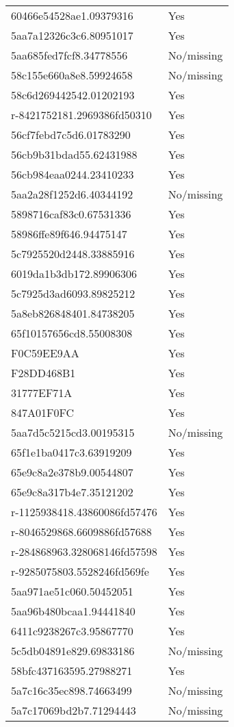 \begin{tabular}{ll}
60466e54528ae1.09379316 & Yes \\
5aa7a12326c3c6.80951017 & Yes \\
5aa685fed7fcf8.34778556 & No/missing \\
58c155e660a8e8.59924658 & No/missing \\
58c6d269442542.01202193 & Yes \\
r-8421752181.2969386fd50310 & Yes \\
56cf7febd7c5d6.01783290 & Yes \\
56cb9b31bdad55.62431988 & Yes \\
56cb984eaa0244.23410233 & Yes \\
5aa2a28f1252d6.40344192 & No/missing \\
5898716caf83c0.67531336 & Yes \\
58986ffe89f646.94475147 & Yes \\
5c7925520d2448.33885916 & Yes \\
6019da1b3db172.89906306 & Yes \\
5c7925d3ad6093.89825212 & Yes \\
5a8eb826848401.84738205 & Yes \\
65f10157656cd8.55008308 & Yes \\
F0C59EE9AA & Yes \\
F28DD468B1 & Yes \\
31777EF71A & Yes \\
847A01F0FC & Yes \\
5aa7d5c5215cd3.00195315 & No/missing \\
65f1e1ba0417c3.63919209 & Yes \\
65e9c8a2e378b9.00544807 & Yes \\
65e9c8a317b4e7.35121202 & Yes \\
r-1125938418.43860086fd57476 & Yes \\
r-8046529868.6609886fd57688 & Yes \\
r-284868963.328068146fd57598 & Yes \\
r-9285075803.5528246fd569fe & Yes \\
5aa971ae51c060.50452051 & Yes \\
5aa96b480bcaa1.94441840 & Yes \\
6411c9238267c3.95867770 & Yes \\
5c5db04891e829.69833186 & No/missing \\
58bfc437163595.27988271 & Yes \\
5a7c16c35ec898.74663499 & No/missing \\
5a7c17069bd2b7.71294443 & No/missing \\

\end{tabular}
